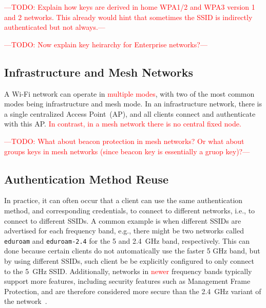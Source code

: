 \documentclass[sigconf,review,anonymous]{acmart}
\newcommand{\wifi}{\mbox{Wi-Fi}}
\DeclareRobustCommand{\red}[1]{\textcolor{red}{#1}}
\begin{document}
\red{---TODO: Explain how keys are derived in home WPA1/2 and WPA3 version 1 and 2 networks.
This already would hint that sometimes the SSID is indirectly authenticated but not always.---}

\red{---TODO: Now explain key heirarchy for Enterprise networks?---}


\subsection{Infrastructure and Mesh Networks}

A \wifi{} network can operate in \red{multiple modes}, with two of the most common modes being infrastructure and mesh mode.
In an infrastructure network, there is a single centralized Access Point~(AP), and all clients connect and authenticate with this AP.
\red{In contrast, in a mesh network there is no central fixed node.}

\red{---TODO: What about beacon protection in mesh networks? Or what about groups keys in mesh networks (since beacon key is essentially a gruop key)?---}

\subsection{Authentication Method Reuse}

In practice, it can often occur that a client can use the same authentication method, and corresponding credentials, to connect to different networks, i.e., to connect to different SSIDs.
A common example is when different SSIDs are advertised for each frequency band, e.g., there might be two networks called \verb|eduroam| and \verb|eduroam-2.4| for the 5 and 2.4~GHz band, respectively.
This can done because certain clients do not automatically use the faster 5 GHz band,
but by using different SSIDs,
such client be be explicitly configured to only connect to the 5~GHz SSID.
Additionally, networks in \red{newer} frequency bands typically support more features, including security features such as Management Frame Protection, and are therefore considered more secure than the 2.4~GHz variant of the network~\cite{schepers2021let}.
\end{document}
